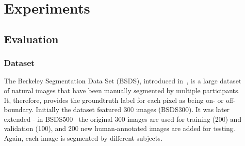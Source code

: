 \chapter{Experiments} %
\label{Chapter5}
\section{Evaluation}
\subsection{Dataset}
The Berkeley Segmentation Data Set (BSDS), introduced in~\cite{Martin01}, is a large dataset of natural images that have been manually segmented by multiple participants. It, therefore, provides the groundtruth label for each pixel as being on- or off-boundary. Initially the dataset featured 300 images (BSDS300). It was later extended - in BSDS500~\cite{Arbelaez11} the original 300 images are used for training (200) and validation (100), and 200 new human-annotated images are added for testing. Again, each image is segmented by different subjects.

